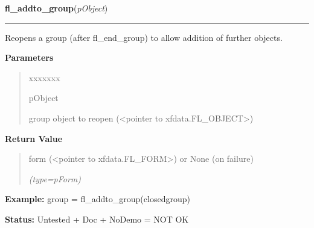 \hspace{.8\funcindent}\begin{boxedminipage}{\funcwidth}

    \raggedright \textbf{fl\_addto\_group}(\textit{pObject})

    \vspace{-1.5ex}

    \rule{\textwidth}{0.5\fboxrule}
\setlength{\parskip}{2ex}
    Reopens a group (after fl\_end\_group) to allow addition of further 
    objects.

\setlength{\parskip}{1ex}
      \textbf{Parameters}
      \vspace{-1ex}

      \begin{quote}
        \begin{Ventry}{xxxxxxx}

          \item[pObject]

          group object to reopen ({\textless}pointer to 
          xfdata.FL\_OBJECT{\textgreater})

        \end{Ventry}

      \end{quote}

      \textbf{Return Value}
    \vspace{-1ex}

      \begin{quote}
      form ({\textless}pointer to xfdata.FL\_FORM{\textgreater}) or None 
      (on failure)

      {\it (type=pForm)}

      \end{quote}

\textbf{Example:} group = fl\_addto\_group(closedgroup)



\textbf{Status:} Untested + Doc + NoDemo = NOT OK



    \end{boxedminipage}

    \label{xformslib:library:fl_get_object_objclass}

    \vspace{0.5ex}

